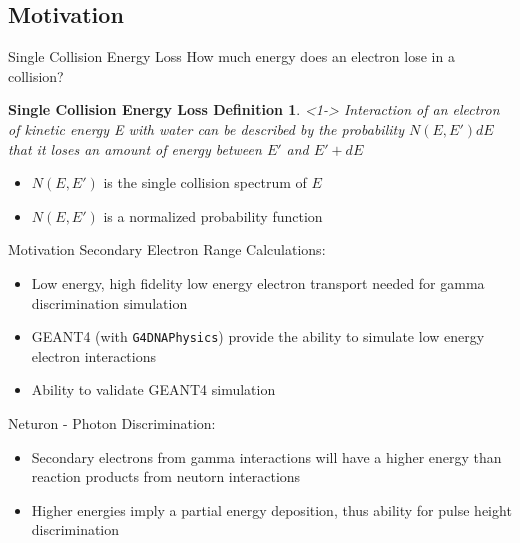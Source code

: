 \documentclass[compress]{beamer}
\begin{document}
\subsection{Motivation}
\begin{frame}{Single Collision Energy Loss}
How much energy does an electron lose in a collision?
  \newtheorem{thm1}{Single Collision Energy Loss Definition}
  \begin{thm1}<1->
    \small
    Interaction of an electron of kinetic energy E with water can be described by the probability $N(E,E')dE$ that it loses an amount of energy between $E'$ and $E'+dE$
  \end{thm1}
  \begin{itemize}
    \item $N(E,E')$ is the single collision spectrum of $E$
    \item $N(E,E')$ is a normalized probability function
  \end{itemize}
\end{frame}
\begin{frame}[fragile]{Motivation}
  Secondary Electron Range Calculations:
  \begin{itemize}
    \item Low energy, high fidelity low energy electron transport needed for gamma discrimination simulation
    \item GEANT4 (with \verb+G4DNAPhysics+) provide the ability to simulate low energy electron interactions
    \item Ability to validate GEANT4 simulation
  \end{itemize}
  Neturon - Photon Discrimination:
  \begin{itemize}
    \item Secondary electrons from gamma interactions will have a higher energy than reaction products from neutorn interactions
    \item Higher energies imply a partial energy deposition, thus ability for pulse height discrimination
  \end{itemize}
\end{frame}
\end{document}
